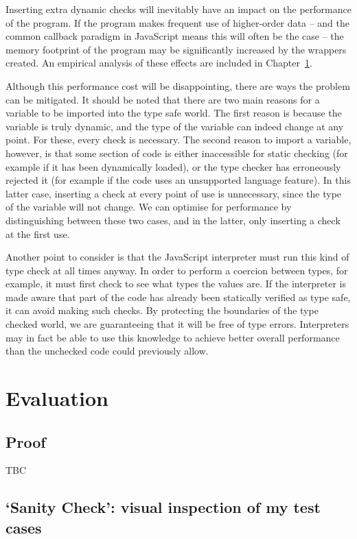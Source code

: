 \documentclass[12pt,a4paper,twoside,openright]{report}
\begin{document}
Inserting extra dynamic checks will inevitably have an impact on the
performance of the program. If the program makes frequent use of higher-order
data -- and the common callback paradigm in JavaScript means this will often be
the case -- the memory footprint of the program may be significantly increased
by the wrappers created. An empirical analysis of these effects are included in
Chapter~\ref{evaluation}.

Although this performance cost will be disappointing, there are ways the
problem can be mitigated. It should be noted that there are two main reasons
for a variable to be imported into the type safe world. The first reason is
because the variable is truly dynamic, and the type of the variable can indeed
change at any point. For these, every check is necessary. The second reason to
import a variable, however, is that some section of code is either inaccessible
for static checking (for example if it has been dynamically loaded), or the
type checker has erroneously rejected it (for example if the code uses an
unsupported language feature). In this latter case, inserting a check at every
point of use is unnecessary, since the type of the variable will not change. We
can optimise for performance by distinguishing between these two cases, and in
the latter, only inserting a check at the first use.

Another point to consider is that the JavaScript interpreter must run this kind
of type check at all times anyway. In order to perform a coercion between
types, for example, it must first check to see what types the values are. If
the interpreter is made aware that part of the code has already been statically
verified as type safe, it can avoid making such checks. By protecting the
boundaries of the type checked world, we are guaranteeing that it will be free
of type errors. Interpreters may in fact be able to use this knowledge to
achieve better overall performance than the unchecked code could previously
allow.

\printbibliography{}

\chapter{Evaluation}\label{evaluation}
\section{Proof}
TBC
\section{`Sanity Check': visual inspection of my test cases}
\end{document}
